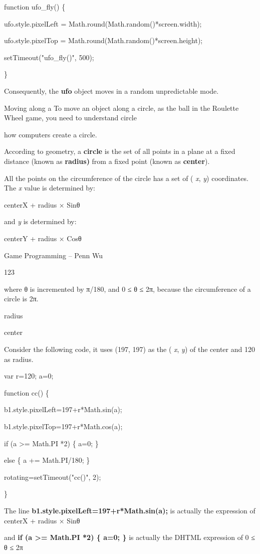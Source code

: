 \documentclass[
]{article}
\begin{document}
function ufo\_fly() \{

ufo.style.pixelLeft = Math.round(Math.random()*screen.width);

ufo.style.pixelTop = Math.round(Math.random()*screen.height);

setTimeout("ufo\_fly()", 500);

\}

Consequently, the \textbf{ufo} object moves in a random unpredictable
mode.

Moving along a To move an object along a circle, as the ball in the
Roulette Wheel game, you need to understand circle

how computers create a circle.

According to geometry, a \textbf{circle} is the set of all points in a
plane at a fixed distance (known as \textbf{radius)} from a fixed point
(known as \textbf{center}).

All the points on the circumference of the circle has a set of (
\emph{x}, \emph{y}) coordinates. The \emph{x} value is determined by:

centerX + radius × Sinθ

and \emph{y} is determined by:

centerY + radius × Cosθ

Game Programming -- Penn Wu

123

\protect\hypertarget{index_split_008.htmlux5cux23p124}{}{}where θ is
incremented by π/180, and 0 ≤ θ \emph{≤} 2π, because the circumference
of a circle is 2π.

radius

center

Consider the following code, it uses (197, 197) as the ( \emph{x},
\emph{y}) of the center and 120 as radius.

var r=120; a=0;

function cc() \{

b1.style.pixelLeft=197+r*Math.sin(a);

b1.style.pixelTop=197+r*Math.cos(a);

if (a \textgreater= Math.PI *2) \{ a=0; \}

else \{ a += Math.PI/180; \}

rotating=setTimeout("cc()", 2);

\}

The line \textbf{b1.style.pixelLeft=197+r*Math.sin(a);} is actually the
expression of centerX + radius × Sinθ

and \textbf{if (a \textgreater= Math.PI *2) \{ a=0; \}} is actually the
DHTML expression of 0 ≤ θ \emph{≤} 2π
\end{document}
